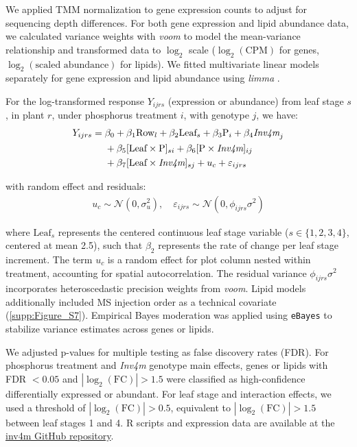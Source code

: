 \documentclass[9pt,twocolumn,twoside]{rilabRxiv}
\newcommand{\invfour}{\textit{Inv4m}\xspace}
\begin{document}
We applied TMM normalization to gene expression counts to adjust for sequencing depth differences.
For both gene expression and lipid abundance data, we calculated variance weights with \textit{voom} \cite{law2014} to model the mean-variance relationship and transformed data to $\log_2$ scale ($\log_2(\text{CPM})$ for genes, $\log_2(\text{scaled abundance})$ for lipids).
We fitted multivariate linear models separately for gene expression and lipid abundance using \textit{limma} \cite{ritchie2015}.

For the log-transformed response $Y_{ijrs}$ (expression or abundance) from leaf stage $s$, in plant $r$, under phosphorus treatment $i$, with genotype $j$, we have:
\begin{eqnarray}
\begin{aligned}
Y_{ijrs} = {}& \beta_0 + \beta_1 \text{Row}_l + \beta_2 \text{Leaf}_s
+ \beta_3 \text{P}_i + \beta_4 \textit{\invfour}_j \\ 
& + \beta_5 [\text{Leaf} \times \text{P}]_{si} 
+ \beta_6 [\text{P} \times \textit{\invfour}]_{ij} \\ 
& + \beta_7 [\text{Leaf} \times \textit{\invfour}]_{sj} 
+ u_c + \varepsilon_{ijrs}
\end{aligned}
\end{eqnarray}

with random effect and residuals:
\begin{eqnarray}
u_c \sim \mathcal{N}(0, \sigma^2_u), \quad \varepsilon_{ijrs} \sim \mathcal{N}(0, \phi_{ijrs}\sigma^2)
\end{eqnarray}

where $\text{Leaf}_s$ represents the centered continuous leaf stage variable ($s \in \{1,2,3,4\}$, centered at mean 2.5), such that $\beta_2$ represents the rate of change per leaf stage increment.
The term $u_c$ is a random effect for plot column nested within treatment, accounting for spatial autocorrelation.
The residual variance $\phi_{ijrs}\sigma^2$ incorporates heteroscedastic precision weights from \textit{voom}.
Lipid models additionally included MS injection order as a technical covariate (\ref{supp:Figure_S7}).
Empirical Bayes moderation was applied using \texttt{eBayes} to stabilize variance estimates across genes or lipids.

We adjusted p-values for multiple testing as false discovery rates (FDR).
For phosphorus treatment and \invfour genotype main effects, genes or lipids with FDR $< 0.05$ and $|\log_2(\text{FC})| > 1.5$ were classified as high-confidence differentially expressed or abundant.
For leaf stage and interaction effects, we used a threshold of $|\log_2(\text{FC})| > 0.5$, equivalent to $|\log_2(\text{FC})| > 1.5$ between leaf stages 1 and 4.
R scripts and expression data are available at the \href{https://github.com/sawers-rellan-labs/inv4m}{inv4m GitHub repository}.
\end{document}
